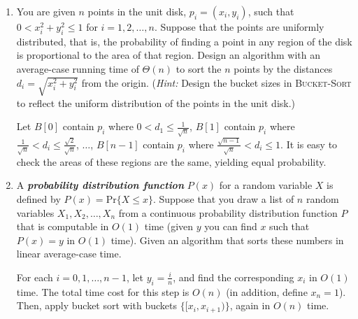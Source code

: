 \documentclass[12pt,reqno]{amsart}
\newif\ifanswer
\begin{document}
\begin{enumerate}[1.]
\item You are given $n$ points in the unit disk, $p_i = (x_i, y_i)$, such that $0 < x_i^2 + y_i^2 \leq 1$ for $i = 1, 2, \dots, n$. Suppose that the points are uniformly distributed, that is, the probability of finding a point in any region of the disk is proportional to the area of that region. Design an algorithm with an average-case running time of $\Theta(n)$ to sort the $n$ points by the distances $d_i = \sqrt{x_i^2 + y_i^2}$ from the origin. (\textit{Hint:} Design the bucket sizes in \textsc{Bucket-Sort} to reflect the uniform distribution of the points in the unit disk.)
\vspace{0.5cm}

\ifanswer
{}

Let $B[0]$ contain $p_i$ where $0 < d_1 \leq \frac{1}{\sqrt{n}}$, $B[1]$ contain $p_i$ where $\frac{1}{\sqrt{n}} < d_i \leq \frac{\sqrt{2}}{\sqrt{n}}$, $\dots$, $B[n - 1]$ contain $p_i$ where $\frac{\sqrt{n - 1}}{\sqrt{n}} < d_i \leq 1$. It is easy to check the areas of these regions are the same, yielding equal probability.
\vspace{1cm}



\item A \textit{\textbf{probability distribution function}} $P(x)$ for a random variable $X$ is defined by $P(x) = \text{Pr}\{X \leq x\}$. Suppose that you draw a list of $n$ random variables $X_1, X_2, \dots, X_n$ from a continuous probability distribution function $P$ that is computable in $O(1)$ time (given $y$ you can find $x$ such that $P(x) = y$ in $O(1)$ time). Given an algorithm that sorts these numbers in linear average-case time.
\vspace{0.5cm}

\ifanswer
{}

For each $i = 0, 1, \dots, n - 1$, let $y_i = \frac{i}{n}$, and find the corresponding $x_i$ in $O(1)$ time. The total time cost for this step is $O(n)$ (in addition, define $x_n = 1$). Then, apply bucket sort with buckets $\{[x_i, x_{i + 1})\}$, again in $O(n)$ time.
\vspace{1cm}




\end{enumerate}
\end{document}

